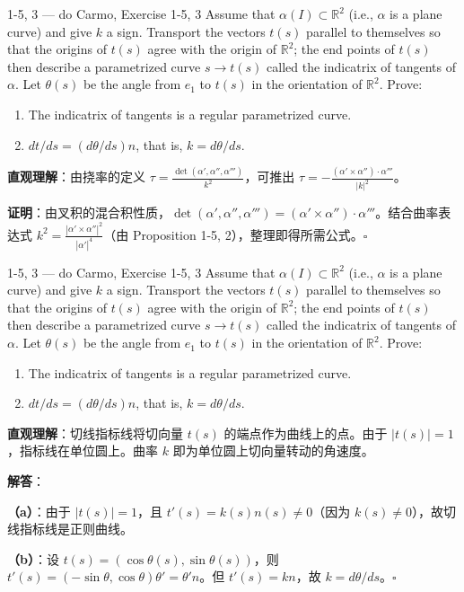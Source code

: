 \begin{exercise}{1-5, 3 — do Carmo, Exercise 1-5, 3}
Assume that $\alpha(I) \subset \mathbb{R}^2$ (i.e., $\alpha$ is a plane curve) and give $k$ a sign. Transport the vectors $t(s)$ parallel to themselves so that the origins of $t(s)$ agree with the origin of $\mathbb{R}^2$; the end points of $t(s)$ then describe a parametrized curve $s \to t(s)$ called the indicatrix of tangents of $\alpha$. Let $\theta(s)$ be the angle from $e_1$ to $t(s)$ in the orientation of $\mathbb{R}^2$. Prove:
\begin{enumerate}
\item[a.] The indicatrix of tangents is a regular parametrized curve.
\item[b.] $dt/ds = (d\theta/ds)n$, that is, $k = d\theta/ds$.
\end{enumerate}
\end{exercise}

\begin{solution}
\textbf{直观理解}：由挠率的定义 $\tau = \frac{\det(\alpha', \alpha'', \alpha''')}{k^2}$，可推出 $\tau = -\frac{(\alpha'\times\alpha'')\cdot\alpha'''}{|k|^2}$。

\textbf{证明}：由叉积的混合积性质，$\det(\alpha', \alpha'', \alpha''') = (\alpha'\times\alpha'')\cdot\alpha'''$。结合曲率表达式 $k^2 = \frac{|\alpha'\times\alpha''|^2}{|\alpha'|^4}$（由 Proposition 1-5, 2），整理即得所需公式。$\square$
\end{solution}

\begin{exercise}{1-5, 3 — do Carmo, Exercise 1-5, 3}
Assume that $\alpha(I) \subset \mathbb{R}^2$ (i.e., $\alpha$ is a plane curve) and give $k$ a sign. Transport the vectors $t(s)$ parallel to themselves so that the origins of $t(s)$ agree with the origin of $\mathbb{R}^2$; the end points of $t(s)$ then describe a parametrized curve $s \to t(s)$ called the indicatrix of tangents of $\alpha$. Let $\theta(s)$ be the angle from $e_1$ to $t(s)$ in the orientation of $\mathbb{R}^2$. Prove:
\begin{enumerate}
\item[a.] The indicatrix of tangents is a regular parametrized curve.
\item[b.] $dt/ds = (d\theta/ds)n$, that is, $k = d\theta/ds$.
\end{enumerate}
\end{exercise}

\begin{solution}
\textbf{直观理解}：切线指标线将切向量 $t(s)$ 的端点作为曲线上的点。由于 $|t(s)|=1$，指标线在单位圆上。曲率 $k$ 即为单位圆上切向量转动的角速度。

\textbf{解答}：

\textbf{（a）}：由于 $|t(s)|=1$，且 $t'(s) = k(s)n(s) \neq 0$（因为 $k(s) \neq 0$），故切线指标线是正则曲线。

\textbf{（b）}：设 $t(s) = (\cos\theta(s), \sin\theta(s))$，则 $t'(s) = (-\sin\theta, \cos\theta)\theta' = \theta'n$。但 $t'(s) = kn$，故 $k = d\theta/ds$。$\square$
\end{solution}

